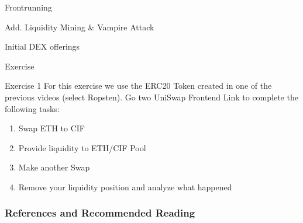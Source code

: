 \documentclass[]{beamer}
\begin{document}
\begin{frame}{Frontrunning}

\end{frame}


\begin{frame}{Add. Liquidity Mining \& Vampire Attack}

\end{frame}


\begin{frame}{Initial DEX offerings}

\end{frame}


\begin{frame}{Exercise}
	\begin{exercise}{Exercise 1}
	For this exercise we use the ERC20 Token created in one of the previous videos (select Ropsten). Go two UniSwap Frontend Link to complete the following tasks:
	
		\begin{enumerate}
			\item Swap ETH to CIF
			\item Provide liquidity to ETH/CIF Pool
			\item Make another Swap
			\item Remove your liquidity position and analyze what happened
		\end{enumerate}
	\end{exercise}
\end{frame}



\begin{frame}%
\frametitle{References and Recommended Reading}
	
	
\end{frame}
\end{document}

